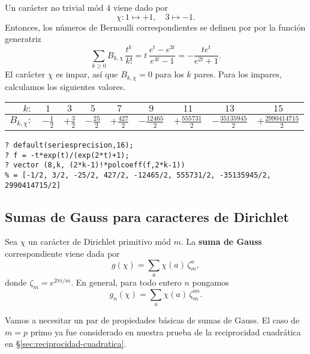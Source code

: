 \begin{ejemplo}
  Un carácter no trivial mód $4$ viene dado por
  $$\chi\colon 1 \mapsto +1, \quad 3 \mapsto -1.$$
  Entonces, los números de Bernoulli correspondientes se definen por por
  la función generatriz
  \[ \sum_{k\ge 0} B_{k,\chi}\,\frac{t^k}{k!} =
     t\,\frac{e^t - e^{3t}}{e^{4t}-1}
     = -\frac{te^t}{e^{2t}+1}. \]
  El carácter $\chi$ es impar, así que $B_{k,\chi} = 0$ para los $k$ pares. Para
  los impares, calculamos los siguientes valores.

  \begin{center}
    \renewcommand{\arraystretch}{1.5}
    \begin{tabular}{rcccccccc}
      \hline
      $k\colon$ & $1$ & $3$ & $5$ & $7$ & $9$ & $11$ & $13$ & $15$ \\
      \hline
      $B_{k,\chi}\colon$ & $-\frac{1}{2}$ & $+\frac{3}{2}$ & $-\frac{25}{2}$ & $+\frac{427}{2}$ & $-\frac{12465}{2}$ & $+\frac{555731}{2}$ & $-\frac{35135945}{2}$ & $+\frac{2990414715}{2}$ \\
      \hline
    \end{tabular}
  \end{center}

\begin{shaded}\small
\begin{verbatim}
? default(seriesprecision,16);
? f = -t*exp(t)/(exp(2*t)+1);
? vector (8,k, (2*k-1)!*polcoeff(f,2*k-1))
% = [-1/2, 3/2, -25/2, 427/2, -12465/2, 555731/2, -35135945/2, 2990414715/2]
\end{verbatim}
\end{shaded}
\end{ejemplo}

\subsection{Sumas de Gauss para caracteres de Dirichlet}

\begin{definicion}
  Sea $\chi$ un carácter de Dirichlet primitivo mód $m$.
  La \textbf{suma de Gauss} correspondiente viene dada por
  $$g (\chi) = \sum_a \chi (a) \, \zeta_m^a,$$
  donde $\zeta_m = e^{2\pi i/m}$. En general, para todo entero $n$ pongamos
  $$g_n (\chi) = \sum_a \chi (a) \, \zeta_m^{an}.$$
\end{definicion}

Vamos a necesitar un par de propiedades básicas de sumas de Gauss. El caso de
$m = p$ primo ya fue considerado en nuestra prueba de la reciprocidad cuadrática
en \S\ref{sec:reciprocidad-cuadratica}.

